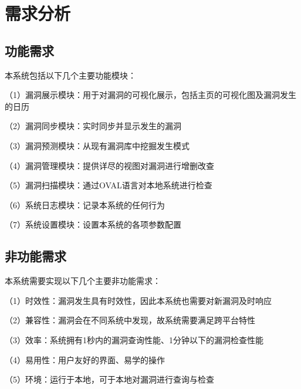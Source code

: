 \documentclass[a4paper]{ctexrep}
\begin{document}
		\section{需求分析}
			\subsection{功能需求}
			本系统包括以下几个主要功能模块：

			（1）漏洞展示模块：用于对漏洞的可视化展示，包括主页的可视化图及漏洞发生的日历

			（2）漏洞同步模块：实时同步并显示发生的漏洞

			（3）漏洞预测模块：从现有漏洞库中挖掘发生模式

			（4）漏洞管理模块：提供详尽的视图对漏洞进行增删改查

			（5）漏洞扫描模块：通过OVAL语言对本地系统进行检查

			（6）系统日志模块：记录本系统的任何行为

			（7）系统设置模块：设置本系统的各项参数配置

			\subsection{非功能需求}
			本系统需要实现以下几个主要非功能需求：

			（1）时效性：漏洞发生具有时效性，因此本系统也需要对新漏洞及时响应

			（2）兼容性：漏洞会在不同系统中发现，故系统需要满足跨平台特性

			（3）效率：系统拥有1秒内的漏洞查询性能、1分钟以下的漏洞检查性能

			（4）易用性：用户友好的界面、易学的操作

			（5）环境：运行于本地，可于本地对漏洞进行查询与检查
\end{document}
